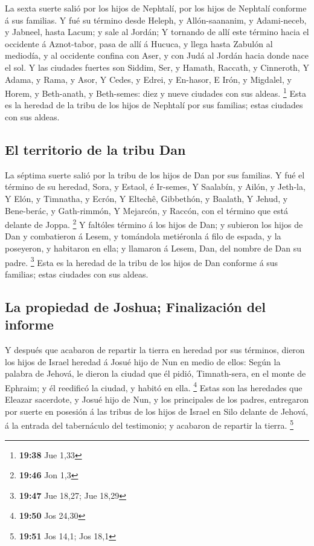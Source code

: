  La sexta suerte salió por los hijos de Nephtalí, por los
hijos de Nephtalí conforme á sus familias.  Y fué su
término desde Heleph, y Allón-saananim, y Adami-neceb, y Jabneel, hasta
Lacum; y sale al Jordán;  Y tornando de allí este término
hacia el occidente á Aznot-tabor, pasa de allí á Hucuca, y llega hasta
Zabulón al mediodía, y al occidente confina con Aser, y con Judá al
Jordán hacia donde nace el sol.  Y las ciudades fuertes son
Siddim, Ser, y Hamath, Raccath, y Cinneroth,  Y Adama, y
Rama, y Asor,  Y Cedes, y Edrei, y En-hasor, 
E Irón, y Migdalel, y Horem, y Beth-anath, y Beth-semes: diez y nueve
ciudades con sus aldeas. \footnote{\textbf{19:38} Jue 1,33}
 Esta es la heredad de la tribu de los hijos de Nephtalí
por sus familias; estas ciudades con sus aldeas.

\hypertarget{el-territorio-de-la-tribu-dan}{%
\subsection{El territorio de la tribu
Dan}\label{el-territorio-de-la-tribu-dan}}

 La séptima suerte salió por la tribu de los hijos de Dan
por sus familias.  Y fué el término de su heredad, Sora, y
Estaol, é Ir-semes,  Y Saalabín, y Ailón, y Jeth-la,
 Y Elón, y Timnatha, y Ecrón,  Y Eltechê,
Gibbethón, y Baalath,  Y Jehud, y Bene-berác, y
Gath-rimmón,  Y Mejarcón, y Raccón, con el término que está
delante de Joppa. \footnote{\textbf{19:46} Jon 1,3}  Y
faltóles término á los hijos de Dan; y subieron los hijos de Dan y
combatieron á Lesem, y tomándola metiéronla á filo de espada, y la
poseyeron, y habitaron en ella; y llamaron á Lesem, Dan, del nombre de
Dan su padre. \footnote{\textbf{19:47} Jue 18,27; Jue 18,29}
 Esta es la heredad de la tribu de los hijos de Dan
conforme á sus familias; estas ciudades con sus aldeas.

\hypertarget{la-propiedad-de-joshua-finalizaciuxf3n-del-informe}{%
\subsection{La propiedad de Joshua; Finalización del
informe}\label{la-propiedad-de-joshua-finalizaciuxf3n-del-informe}}

 Y después que acabaron de repartir la tierra en heredad
por sus términos, dieron los hijos de Israel heredad á Josué hijo de Nun
en medio de ellos:  Según la palabra de Jehová, le dieron
la ciudad que él pidió, Timnath-sera, en el monte de Ephraim; y él
reedificó la ciudad, y habitó en ella. \footnote{\textbf{19:50} Jos
  24,30}  Estas son las heredades que Eleazar sacerdote, y
Josué hijo de Nun, y los principales de los padres, entregaron por
suerte en posesión á las tribus de los hijos de Israel en Silo delante
de Jehová, á la entrada del tabernáculo del testimonio; y acabaron de
repartir la tierra. \footnote{\textbf{19:51} Jos 14,1; Jos 18,1}

